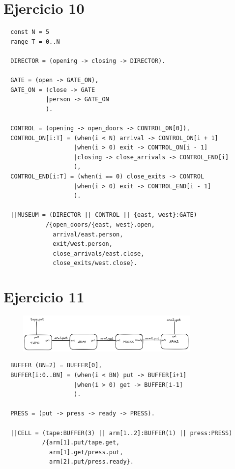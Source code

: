 \documentclass{article}
\begin{document}
\section*{Ejercicio 10}
\begin{verbatim}
  const N = 5 
  range T = 0..N 

  DIRECTOR = (opening -> closing -> DIRECTOR).

  GATE = (open -> GATE_ON),
  GATE_ON = (close -> GATE
            |person -> GATE_ON
            ).

  CONTROL = (opening -> open_doors -> CONTROL_ON[0]),
  CONTROL_ON[i:T] = (when(i < N) arrival -> CONTROL_ON[i + 1]
                    |when(i > 0) exit -> CONTROL_ON[i - 1]
                    |closing -> close_arrivals -> CONTROL_END[i]
                    ),
  CONTROL_END[i:T] = (when(i == 0) close_exits -> CONTROL
                    |when(i > 0) exit -> CONTROL_END[i - 1]
                    ).

  ||MUSEUM = (DIRECTOR || CONTROL || {east, west}:GATE)
            /{open_doors/{east, west}.open,
              arrival/east.person,
              exit/west.person,
              close_arrivals/east.close,
              close_exits/west.close}.
\end{verbatim}

\section*{Ejercicio 11}
\begin{figure}[ht]
	\includegraphics[width=0.8\textwidth]{01-11.png}
	\centering
\end{figure}
\begin{verbatim}
  BUFFER (BN=2) = BUFFER[0],
  BUFFER[i:0..BN] = (when(i < BN) put -> BUFFER[i+1]
                    |when(i > 0) get -> BUFFER[i-1]
                    ).

  PRESS = (put -> press -> ready -> PRESS).

  ||CELL = (tape:BUFFER(3) || arm[1..2]:BUFFER(1) || press:PRESS)
           /{arm[1].put/tape.get,
             arm[1].get/press.put,
             arm[2].put/press.ready}.
\end{verbatim}

\pagebreak
\end{document}

